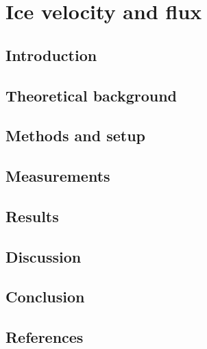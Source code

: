 

\renewcommand{\chapterauthor}{Julien, Linda Thielke, Moritz Bitterling}
\chapter{Ice velocity and flux}
\label{icevel}

\begin{abstract}

\end{abstract}


\section{Introduction}


\section{Theoretical background}


\section{Methods and setup}


\section{Measurements}


\section{Results}


\section{Discussion}


\section{Conclusion}


\newpage
\section*{References}
%

